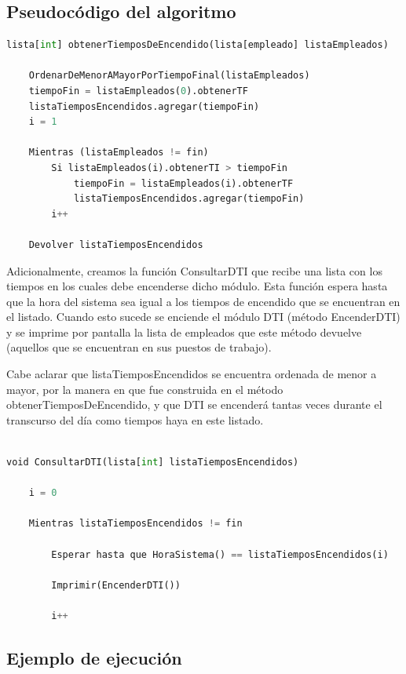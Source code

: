 \documentclass{article}
\begin{document}
\subsection{Pseudocódigo del algoritmo}

\begin{lstlisting}[language=Python, caption=Algoritmo greddy para tiempos de encendido]
lista[int] obtenerTiemposDeEncendido(lista[empleado] listaEmpleados)

    OrdenarDeMenorAMayorPorTiempoFinal(listaEmpleados)
    tiempoFin = listaEmpleados(0).obtenerTF
    listaTiemposEncendidos.agregar(tiempoFin)
    i = 1

    Mientras (listaEmpleados != fin)
        Si listaEmpleados(i).obtenerTI > tiempoFin
            tiempoFin = listaEmpleados(i).obtenerTF
            listaTiemposEncendidos.agregar(tiempoFin)
        i++

    Devolver listaTiemposEncendidos	
\end{lstlisting}    


Adicionalmente, creamos la función ConsultarDTI que recibe una lista con los tiempos en los cuales debe encenderse dicho módulo. 
Esta función espera hasta que la hora del sistema sea igual a los tiempos de encendido que se encuentran en el listado. 
Cuando esto sucede se enciende el módulo DTI (método EncenderDTI) y se imprime por pantalla la lista de empleados que este 
método devuelve (aquellos que se encuentran en sus puestos de trabajo). 

Cabe aclarar que listaTiemposEncendidos se encuentra ordenada de menor a mayor, 
por la manera en que fue construida en el método obtenerTiemposDeEncendido, y que DTI se encenderá tantas veces durante el transcurso del día como tiempos haya en este listado.

\begin{lstlisting}[language=Python, caption=Proceso de consulta a DTI]

void ConsultarDTI(lista[int] listaTiemposEncendidos)

    i = 0
        
    Mientras listaTiemposEncendidos != fin

        Esperar hasta que HoraSistema() == listaTiemposEncendidos(i)

        Imprimir(EncenderDTI())
        
        i++

\end{lstlisting}    


\subsection{Ejemplo de ejecución}
\end{document}
